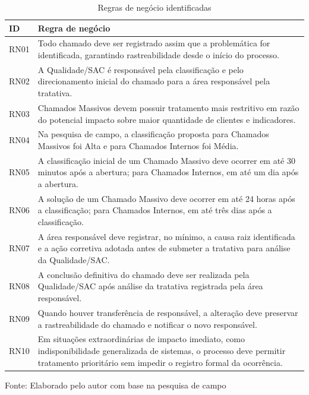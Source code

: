 \begin{table}[H]
\caption{Regras de negócio identificadas}
\label{tab:regras-negocio}
\centering
\begin{tabular}{p{1.0cm} p{10.9cm}}
\hline
\textbf{ID} & \textbf{Regra de negócio} \\
\hline
RN01 & Todo chamado deve ser registrado assim que a
problemática for identificada, garantindo rastreabilidade
desde o início do processo. \\
\hline
RN02 & A Qualidade/SAC é responsável pela classificação e
pelo direcionamento inicial do chamado para a área
responsável pela tratativa. \\
\hline
RN03 & Chamados Massivos devem possuir tratamento mais
restritivo em razão do potencial impacto sobre maior
quantidade de clientes e indicadores. \\
\hline
RN04 & Na pesquisa de campo, a classificação proposta para
Chamados Massivos foi Alta e para Chamados Internos foi
Média. \\
\hline
RN05 & A classificação inicial de um Chamado Massivo deve
ocorrer em até 30 minutos após a abertura; para Chamados
Internos, em até um dia após a abertura. \\
\hline
RN06 & A solução de um Chamado Massivo deve ocorrer em até
24 horas após a classificação; para Chamados Internos, em
até três dias após a classificação. \\
\hline
RN07 & A área responsável deve registrar, no mínimo, a causa
raiz identificada e a ação corretiva adotada antes de
submeter a tratativa para análise da Qualidade/SAC. \\
\hline
RN08 & A conclusão definitiva do chamado deve ser realizada
pela Qualidade/SAC após análise da tratativa registrada pela
área responsável. \\
\hline
RN09 & Quando houver transferência de responsável, a
alteração deve preservar a rastreabilidade do chamado e
notificar o novo responsável. \\
\hline
RN10 & Em situações extraordinárias de impacto imediato,
como indisponibilidade generalizada de sistemas, o processo
deve permitir tratamento prioritário sem impedir o registro
formal da ocorrência. \\
\hline
\end{tabular}
\raggedright
\par
{\fontsize{10}{12}\selectfont Fonte: Elaborado pelo autor
com base na pesquisa de campo}
\end{table}

